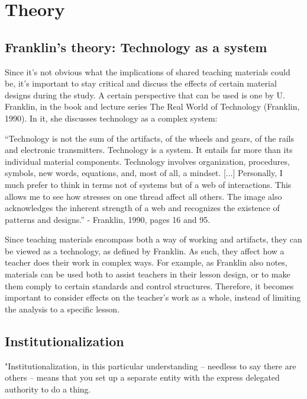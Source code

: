 \chapter{Theory}

\section{Franklin's theory: Technology as a system}
Since it's not obvious what the implications of shared teaching materials could be, it's
important to stay critical and discuss the effects of certain material designs during the study. A
certain perspective that can be used is one by U. Franklin, in the book and lecture series The
Real World of Technology (Franklin, 1990). In it, she discusses technology as a complex system:

“Technology is not the sum of the artifacts, of the wheels and gears, of the rails and
electronic transmitters. Technology is a system. It entails far more than its individual
material components. Technology involves organization, procedures, symbols, new
words, equations, and, most of all, a mindset. [...] Personally, I much prefer to think in
terms not of systems but of a web of interactions. This allows me to see how stresses on
one thread affect all others. The image also acknowledges the inherent strength of a
web and recognizes the existence of patterns and designs.” - Franklin, 1990, pages 16
and 95.

Since teaching materials encompass both a way of working and artifacts, they can be viewed
as a technology, as defined by Franklin. As such, they affect how a teacher does their work in
complex ways. For example, as Franklin also notes, materials can be used both to assist
teachers in their lesson design, or to make them comply to certain standards and control
structures. Therefore, it becomes important to consider effects on the teacher's work as a
whole, instead of limiting the analysis to a specific lesson.

\section{Institutionalization}
"Institutionalization, in this particular understanding -- needless to say there are others -- means that you set up a separate entity with the express delegated authority to do a thing.

